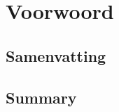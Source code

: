\titleformat{\chapter}{\vspace{-1in}}{}{}{\Huge\textbf}
\chapter*{Voorwoord}\thispagestyle{fancy}\vspace{-.35in}

\newpage

\section*{Samenvatting}
\newpage

\section*{Summary}
\newpage